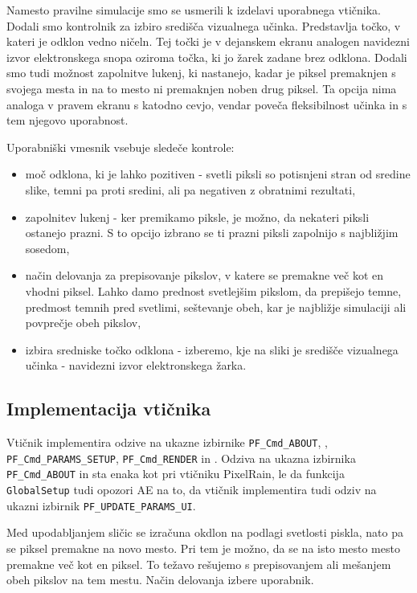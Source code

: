 \documentclass[a4paper, 12pt]{book}
\begin{document}
Namesto pravilne simulacije smo se usmerili k izdelavi uporabnega vtičnika.
Dodali smo kontrolnik za izbiro središča vizualnega učinka.
Predstavlja točko, v kateri je odklon vedno ničeln.
Tej točki je v dejanskem ekranu analogen navidezni izvor elektronskega snopa oziroma točka, ki jo žarek zadane brez odklona.
Dodali smo tudi možnost zapolnitve lukenj, ki nastanejo, kadar je piksel premaknjen s svojega mesta in na to mesto ni premaknjen noben drug piksel.
Ta opcija nima analoga v pravem ekranu s katodno cevjo, vendar poveča fleksibilnost učinka in s tem njegovo uporabnost.

Uporabniški vmesnik vsebuje sledeče kontrole:
\begin{itemize}
\item{moč odklona, ki je lahko pozitiven - svetli piksli so potisnjeni stran od sredine slike, temni pa proti sredini, ali pa negativen z obratnimi rezultati,}
\item{zapolnitev lukenj - ker premikamo piksle, je možno, da nekateri piksli ostanejo prazni. S to opcijo izbrano se ti prazni piksli zapolnijo s najbližjim sosedom,}
\item{način delovanja za prepisovanje pikslov, v katere se premakne več kot en vhodni piksel. Lahko damo prednost svetlejšim pikslom, da prepišejo temne,
	predmost temnih pred svetlimi, seštevanje obeh, kar je najbližje simulaciji ali povprečje obeh pikslov,}
\item{izbira sredniske točko odklona - izberemo, kje na sliki je središče vizualnega učinka - navidezni izvor elektronskega žarka.}
\end{itemize}


\subsection{Implementacija vtičnika}

Vtičnik implementira odzive na ukazne izbirnike \verb!PF_Cmd_ABOUT!, , \verb!PF_Cmd_PARAMS_SETUP!,
\verb!PF_Cmd_RENDER! in .
Odziva na ukazna izbirnika \verb!PF_Cmd_ABOUT! in  sta enaka kot pri vtičniku PixelRain, le da funkcija \verb!GlobalSetup! tudi
opozori AE na to, da vtičnik implementira tudi odziv na ukazni izbirnik \verb!PF_UPDATE_PARAMS_UI!.

Med upodabljanjem sličic se izračuna okdlon na podlagi svetlosti piskla, nato pa se piksel premakne na novo mesto.
Pri tem je možno, da se na isto mesto mesto premakne več kot en piksel.
To težavo rešujemo s prepisovanjem ali mešanjem obeh pikslov na tem mestu.
Način delovanja izbere uporabnik.
\end{document}
